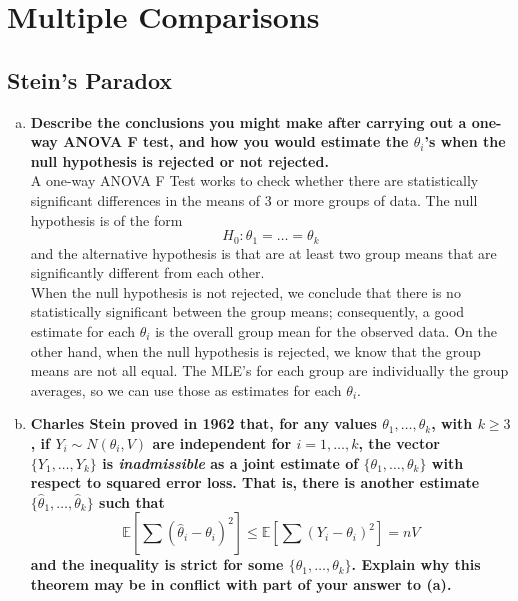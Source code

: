 \setcounter{section}{7}
\section{Multiple Comparisons}

\setcounter{subsection}{2}
\subsection{Stein's Paradox}
\graphicspath{{notes/img}}

\begin{enumerate}[a)]
    \item \textbf{Describe the conclusions you might make after carrying out a one-way ANOVA F test,
    and how you would estimate the $\theta_i$'s when the null hypothesis is rejected or not rejected.} \\

    A one-way ANOVA F Test works to check whether there are statistically significant differences in the means of 3 or more groups of data. The null hypothesis is of the form
    \[
        H_0\colon \theta_1 = \dots = \theta_k
    \]
    and the alternative hypothesis is that are at least two group means that are significantly different from each other. \\

    When the null hypothesis is not rejected, we conclude that there is no statistically significant between the group means; consequently, a good estimate for each $\theta_i$ is the overall group mean for the observed data.
    On the other hand, when the null hypothesis is rejected, we know that the group means are not all equal. The MLE's for each group are individually the group averages, so we can use those as estimates for each $\theta_i$. \\

    \item \textbf{Charles Stein proved in 1962 that, for any values $\theta_1, \dots, \theta_k$, with $k \geq 3$, if $Y_i \sim N(\theta_i, V)$ are independent for $i = 1, \dots, k$, the
    vector $\{ Y_1, \dots, Y_k \}$ is \textit{inadmissible} as a joint estimate of $\{ \theta_1, \dots, \theta_k \}$ with respect to squared error loss. 
    That is, there is another estimate $\{ \hat{\theta}_1, \dots, \hat{\theta}_k \}$ such that}
    \[
        \mathbb{E}\left[ \sum (\hat{\theta}_i - \theta_i)^2 \right] \leq \mathbb{E}\left[ \sum (Y_i - \theta_i)^2 \right] = nV
    \]
    \textbf{and the inequality is strict for some $\{ \theta_1, \dots, \theta_k \}$. Explain why this theorem may be in conflict with part of your answer to (a).} \\


\end{enumerate}
